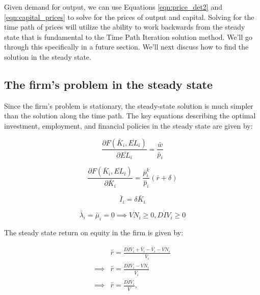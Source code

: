 \documentclass[letterpaper,12pt]{article}
\theoremstyle{definition}
\begin{document}
\begin{spacing}{1.5}
Given demand for output, we can use Equations \ref{eqn:price_det2} and \ref{eqn:capital_prices} to solve for the prices of output and capital.  Solving for the time path of prices will utilize the ability to work backwards from the steady state that is fundamental to the Time Path Iteration solution method.  We'll go through this specifically in a future section.  We'll next discuss how to find the solution in the steady state.

\subsection*{The firm's problem in the steady state}	

Since the firm's problem is stationary, the steady-state solution is much simpler than the solution along the time path. The key equations describing the optimal investment, employment, and financial policies in the steady state are given by:

\begin{equation}
\label{eqn:foc_l_ss}
\frac{\partial F(\bar{K}_{i},\overline{EL}_{i})}{\partial \overline{EL}_{i}} = \frac{\bar{w}}{\bar{p}_{i}}
\end{equation}

\begin{equation}
\label{eqn:foc_k_ss}
\frac{\partial F(\bar{K}_{i},\overline{EL}_{i})}{\partial \bar{K}_{i}} = \frac{\bar{p}^{k}_{i}}{\bar{p}_{i}}(\bar{r}+\delta)
\end{equation}

\begin{equation}
\label{eqn:i_ss}
\bar{I}_{i} = \delta \bar{K}_{i}
\end{equation}

\begin{equation}
\label{eqn:foc_vn_ss}
\bar{\lambda}_{i}=\bar{\mu}_{i} = 0 \implies \overline{VN}_{i}\geq0, \overline{DIV}_{i}\geq0
\end{equation}

The steady state return on equity in the firm is given by:

\begin{equation}
\label{eqn:ss_return}
\begin{split}
& \bar{r} = \frac{\overline{DIV}_{i}+\bar{V}_{i}-\bar{V}_{i}-\overline{VN}_{i}}{\bar{V}_{i}}\\
\implies & \bar{r} =  \frac{\overline{DIV}_{i}-\overline{VN}_{i}}{\bar{V}_{i}}\\
\implies & \bar{r} =  \frac{\overline{DIV}_{i}}{\bar{V}},\\
\end{split}
\end{equation}


\end{spacing}
\end{document}
